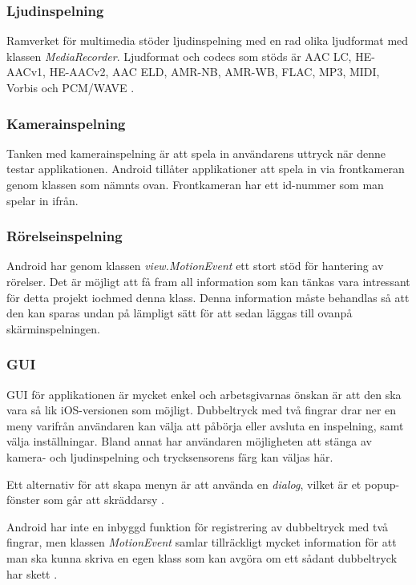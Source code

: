 \subsubsection{Ljudinspelning}
\label{subsubsec:ljudinspelning}
Ramverket för multimedia stöder ljudinspelning med en rad olika ljudformat med klassen \textit{MediaRecorder}. Ljudformat och codecs som stöds är AAC LC, HE-AACv1, HE-AACv2, AAC ELD, AMR-NB, AMR-WB, FLAC, MP3, MIDI, Vorbis och PCM/WAVE \parencite{sound}.

\subsubsection{Kamerainspelning}
\label{subsubsec:kamerainspelning}
Tanken med kamerainspelning är att spela in användarens uttryck när denne testar applikationen. Android tillåter applikationer att spela in via frontkameran genom klassen  \parencite{frontcamera} som nämnts ovan. Frontkameran har ett id-nummer som man spelar in ifrån.

\subsubsection{Rörelseinspelning}
Android har genom klassen \emph{view.MotionEvent}\parencite{motionevent} ett stort stöd för hantering av rörelser. Det är möjligt att få fram all information som kan tänkas vara intressant för detta projekt iochmed denna klass. Denna information måste behandlas så att den kan sparas undan på lämpligt sätt för att sedan läggas till ovanpå skärminspelningen.

\subsubsection{GUI}
\label{subsubsec:gui}
GUI för applikationen är mycket enkel och arbetsgivarnas önskan är att den ska vara så lik iOS-versionen som möjligt. Dubbeltryck med två fingrar drar ner en meny varifrån användaren kan välja att påbörja eller avsluta en inspelning, samt välja inställningar. Bland annat har användaren möjligheten att stänga av kamera- och ljudinspelning och trycksensorens färg kan väljas här. 

Ett alternativ för att skapa menyn är att använda en \textit{dialog}, vilket är et popup-fönster som går att skräddarsy \parencite{dialog}. 

Android har inte en inbyggd funktion för registrering av dubbeltryck med två fingrar, men klassen \textit{MotionEvent} samlar tillräckligt mycket information för att man ska kunna skriva en egen klass som kan avgöra om ett sådant dubbeltryck har skett \parencite{dbletap}.


